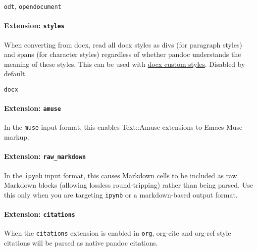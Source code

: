 \documentclass[
]{article}
\providecommand{\tightlist}{%
  \setlength{\itemsep}{0pt}\setlength{\parskip}{0pt}}
\begin{document}
\begin{description}
\tightlist
\item[output formats]
\texttt{odt}, \texttt{opendocument}
\end{description}

\paragraph{\texorpdfstring{Extension:
\texttt{styles}}{Extension: styles}}\label{ext-styles}

When converting from docx, read all docx styles as divs (for paragraph
styles) and spans (for character styles) regardless of whether pandoc
understands the meaning of these styles. This can be used with
\hyperref[custom-styles]{docx custom styles}. Disabled by default.

\begin{description}
\tightlist
\item[input formats]
\texttt{docx}
\end{description}

\paragraph{\texorpdfstring{Extension:
\texttt{amuse}}{Extension: amuse}}\label{extension-amuse}

In the \texttt{muse} input format, this enables Text::Amuse extensions
to Emacs Muse markup.

\paragraph{\texorpdfstring{Extension:
\texttt{raw\_markdown}}{Extension: raw\_markdown}}\label{extension-raw_markdown}

In the \texttt{ipynb} input format, this causes Markdown cells to be
included as raw Markdown blocks (allowing lossless round-tripping)
rather than being parsed. Use this only when you are targeting
\texttt{ipynb} or a markdown-based output format.

\paragraph{\texorpdfstring{Extension:
\texttt{citations}}{Extension: citations}}\label{org-citations}

When the \texttt{citations} extension is enabled in \texttt{org},
org-cite and org-ref style citations will be parsed as native pandoc
citations.
\end{document}
